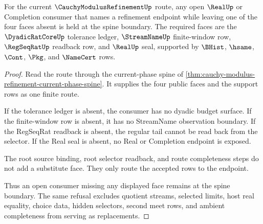\begin{theorem}
\label{thm:cauchy-modulus-refinement-open-phase-spine-lock}
For the current $\CauchyModulusRefinementUp$ route, any open $\RealUp$ or Completion consumer that names a refinement endpoint while leaving one of the four faces absent is held at the spine boundary. The required faces are the $\DyadicRatCoreUp$ tolerance ledger, $\StreamNameUp$ finite-window row, $\RegSeqRatUp$ readback row, and $\RealUp$ seal, supported by $\BHist$, $\hsame$, $\Cont$, $\Pkg$, and $\NameCert$ rows.
\end{theorem}
\begin{proof}
Read the route through the current-phase spine of \autoref{thm:cauchy-modulus-refinement-current-phase-spine}. It supplies the four public faces and the support rows as one finite route.

If the tolerance ledger is absent, the consumer has no dyadic budget surface. If the finite-window row is absent, it has no StreamName observation boundary. If the RegSeqRat readback is absent, the regular tail cannot be read back from the selector. If the Real seal is absent, no Real or Completion endpoint is exposed.

The root source binding, root selector readback, and route completeness steps do not add a substitute face. They only route the accepted rows to the endpoint.

Thus an open consumer missing any displayed face remains at the spine boundary. The same refusal excludes quotient streams, selected limits, host real equality, choice data, hidden selectors, second meet rows, and ambient completeness from serving as replacements.
\end{proof}


